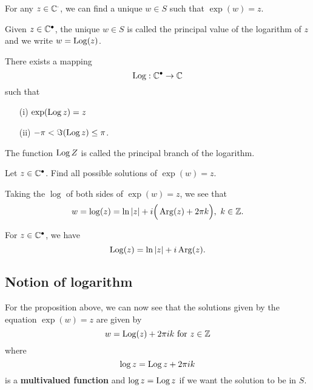\documentclass[a4paper]{report}
\begin{document}
\begin{corollary}
    For any \( z \in \mathbb{C}^{\cdot} \), we can find a unique \( w \in S  \) such that \( \exp(w) = z \).
\end{corollary}

\begin{definition}[ ]
    Given \( z \in \mathbb{C}^{\bullet} \), the unique \( w \in S  \) is called the principal value of the logarithm of \( z  \) and we write \( w = \operatorname{Log}(z) \).
\end{definition}

\begin{theorem}[ ]
    There exists a mapping 
    \[  \operatorname{Log}: \mathbb{C}^{\bullet} \to \mathbb{C}  \] such that 
    \begin{enumerate}
        \item[(i)] \( \exp(\operatorname{Log} z) = z  \)
        \item[(ii)] \( - \pi < \Im(\operatorname{Log} z) \leq \pi \).
    \end{enumerate}
\end{theorem}

\begin{definition}
    The function \( \operatorname{Log} Z  \) is called the principal branch of the logarithm. 
\end{definition}

\begin{problem}
    Let \( z \in \mathbb{C}^{\bullet} \). Find all possible solutions of \( \exp(w) = z  \).
\end{problem}

\begin{solution}
    Taking the \( \log \) of both sides of \( \exp(w) = z  \), we see that 
    \[  w  = \log(z) = \ln | z |  + i \Big(  \operatorname{Arg}(z) + 2 \pi k  \Big), \ k \in \mathbb{Z}.  \]
\end{solution}

\begin{lemma}
   For \( z \in \mathbb{C}^{\bullet} \), we have  
   \[  \operatorname{Log}(z) = \ln | z |  + i \operatorname{Arg}(z). \]
\end{lemma}

\subsection{Notion of logarithm}
For the proposition above, we can now see that the solutions given by the equation \( \exp(w) = z  \) are given by
\[  w = \Log(z) + 2 \pi i k  \ \text{for} \ z \in \Z   \]
where 
\[  \log z = \operatorname{Log} z + 2\pi i k  \]
is a \textbf{multivalued function} and \( \log z = \operatorname{Log} z  \) if we want the solution to be in \( S  \).
\end{document}
